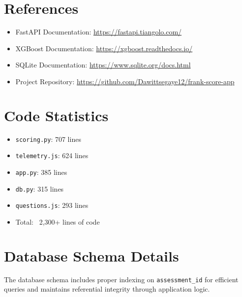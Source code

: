 \documentclass[11pt,a4paper]{article}
\begin{document}
\section{References}

\begin{itemize}
    \item FastAPI Documentation: \url{https://fastapi.tiangolo.com/}
    \item XGBoost Documentation: \url{https://xgboost.readthedocs.io/}
    \item SQLite Documentation: \url{https://www.sqlite.org/docs.html}
    \item Project Repository: \url{https://github.com/Dawittsegaye12/frank-score-app}
\end{itemize}

\appendix

\section{Code Statistics}
\begin{itemize}
    \item \texttt{scoring.py}: 707 lines
    \item \texttt{telemetry.js}: 624 lines
    \item \texttt{app.py}: 385 lines
    \item \texttt{db.py}: 315 lines
    \item \texttt{questions.js}: 293 lines
    \item Total: ~2,300+ lines of code
\end{itemize}

\section{Database Schema Details}
The database schema includes proper indexing on \texttt{assessment\_id} for efficient queries and maintains referential integrity through application logic.
\end{document}
